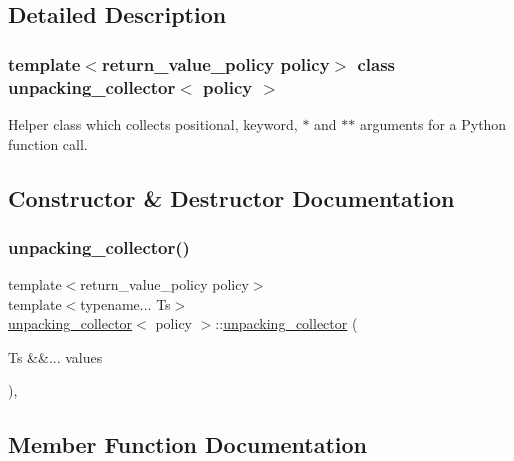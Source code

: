 \subsection{Detailed Description}
\subsubsection*{template$<$return\+\_\+value\+\_\+policy policy$>$\newline
class unpacking\+\_\+collector$<$ policy $>$}

Helper class which collects positional, keyword, $\ast$ and $\ast$$\ast$ arguments for a Python function call. 

\subsection{Constructor \& Destructor Documentation}
\mbox{\label{classunpacking__collector_a8cc5fdce9ceb3faf99180e480efa0367}} 
\subsubsection{\texorpdfstring{unpacking\_collector()}{unpacking\_collector()}}
{\footnotesize\ttfamily template$<$return\+\_\+value\+\_\+policy policy$>$ \\
template$<$typename... Ts$>$ \\
\mbox{\hyperlink{classunpacking__collector}{unpacking\+\_\+collector}}$<$ policy $>$\+::\mbox{\hyperlink{classunpacking__collector}{unpacking\+\_\+collector}} (\begin{DoxyParamCaption}\item[{Ts \&\&...}]{values }\end{DoxyParamCaption})\hspace{0.3cm}{\ttfamily [inline]}, {\ttfamily [explicit]}}



\subsection{Member Function Documentation}
\mbox{\label{classunpacking__collector_a8c2a4543599919b9d8b4c13a5cf6cf02}} 
